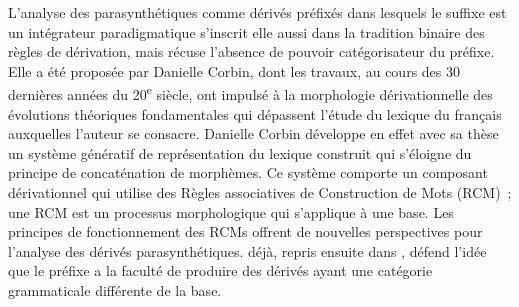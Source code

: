 \documentclass[output=paper]{langsci/langscibook}
\begin{document}
L'analyse des parasynthétiques comme  dérivés préfixés dans lesquels le suffixe est un intégrateur paradigmatique s'inscrit elle aussi dans la tradition binaire des règles de dérivation, mais récuse l'absence de pouvoir catégorisateur du préfixe. Elle a été proposée par Danielle Corbin, dont les travaux, au cours des 30 dernières années du 20\textsuperscript{e} siècle, ont impulsé à la morphologie dérivationnelle des évolutions théoriques fondamentales qui dépassent l'étude du lexique du français auxquelles l'auteur se consacre. Danielle Corbin développe en effet avec sa thèse \citep{Corbin87} un système génératif de représentation du lexique construit qui s'éloigne du principe de concaténation de morphèmes. Ce système comporte un composant dérivationnel qui utilise des Règles associatives de Construction de Mots (RCM)~; une RCM est un processus morphologique qui s'applique à une base.  Les principes de fonctionnement des RCMs offrent de nouvelles perspectives pour l'analyse des dérivés parasynthétiques.  \citet{corbin1980.parasynthese} déjà, repris ensuite dans \citet{Corbin87}, défend l'idée que le préfixe a la faculté de produire des dérivés ayant une catégorie grammaticale différente de la base.
\end{document}

